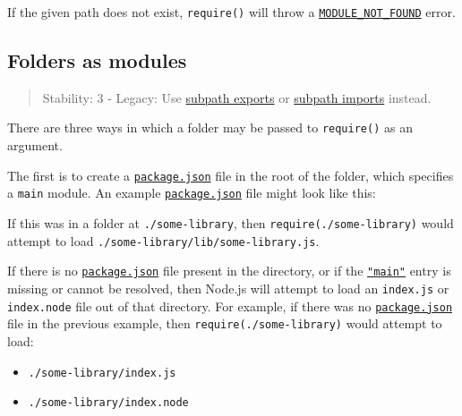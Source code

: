 If the given path does not exist, \texttt{require()} will throw a
\href{errors.md\#module_not_found}{\texttt{MODULE\_NOT\_FOUND}} error.

\subsection{Folders as modules}\label{folders-as-modules}

\begin{quote}
Stability: 3 - Legacy: Use \href{packages.md\#subpath-exports}{subpath
exports} or \href{packages.md\#subpath-imports}{subpath imports}
instead.
\end{quote}

There are three ways in which a folder may be passed to
\texttt{require()} as an argument.

The first is to create a
\href{packages.md\#nodejs-packagejson-field-definitions}{\texttt{package.json}}
file in the root of the folder, which specifies a \texttt{main} module.
An example
\href{packages.md\#nodejs-packagejson-field-definitions}{\texttt{package.json}}
file might look like this:

\begin{Shaded}
\begin{Highlighting}[]
\FunctionTok{\{}  \FunctionTok{:} \FunctionTok{,}
   \FunctionTok{:}  \FunctionTok{\}}
\end{Highlighting}
\end{Shaded}

If this was in a folder at \texttt{./some-library}, then
\texttt{require(\textquotesingle{}./some-library\textquotesingle{})}
would attempt to load \texttt{./some-library/lib/some-library.js}.

If there is no
\href{packages.md\#nodejs-packagejson-field-definitions}{\texttt{package.json}}
file present in the directory, or if the
\href{packages.md\#main}{\texttt{"main"}} entry is missing or cannot be
resolved, then Node.js will attempt to load an \texttt{index.js} or
\texttt{index.node} file out of that directory. For example, if there
was no
\href{packages.md\#nodejs-packagejson-field-definitions}{\texttt{package.json}}
file in the previous example, then
\texttt{require(\textquotesingle{}./some-library\textquotesingle{})}
would attempt to load:

\begin{itemize}
\tightlist
\item
  \texttt{./some-library/index.js}
\item
  \texttt{./some-library/index.node}
\end{itemize}


